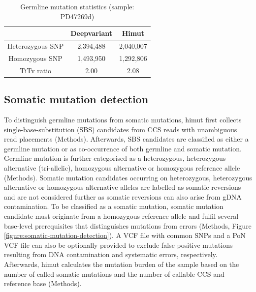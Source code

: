 \begin{table}[h!]
\caption{Germline mutation statistics (sample: PD47269d)}
\label{tab:himut-vs-deepvariant}
\begin{tabular}{c|c|c}
& Deepvariant & Himut \\ \hline
Heterozygous SNP & 2,394,488 & 2,040,007 \\ \hline
Homozygous SNP & 1,493,950 & 1,292,806 \\ \hline
TiTv ratio & 2.00 & 2.08 \\ \hline
\end{tabular}
\end{table}

\subsection{Somatic mutation detection}

To distinguish germline mutations from somatic mutations, himut first collects single-base-substitution (SBS) candidates from CCS reads with unambiguous read placements (Methods). Afterwards, SBS candidates are classified as either a germline mutation or as co-occurrence of both germline and somatic mutation. Germline mutation is further categorised as a heterozygous, heterozygous alternative (tri-allelic), homozygous alternative or homozygous reference allele (Methods). Somatic mutation candidates occurring on heterozygous, heterozygous alternative or homozygous alternative alleles are labelled as somatic reversions and are not considered further as somatic reversions can also arise from gDNA contamination. To be classified as a somatic mutation, somatic mutation candidate must originate from a homozygous reference allele and fulfil several base-level prerequisites that distinguishes mutations from errors (Methods, Figure \ref{figure:somatic-mutation-detection}). A VCF file with common SNPs and a PoN VCF file can also be optionally provided to exclude false positive mutations resulting from DNA contamination and systematic errors, respectively. Afterwards, himut calculates the mutation burden of the sample based on the number of called somatic mutations and the number of callable CCS and reference base (Methods). 

